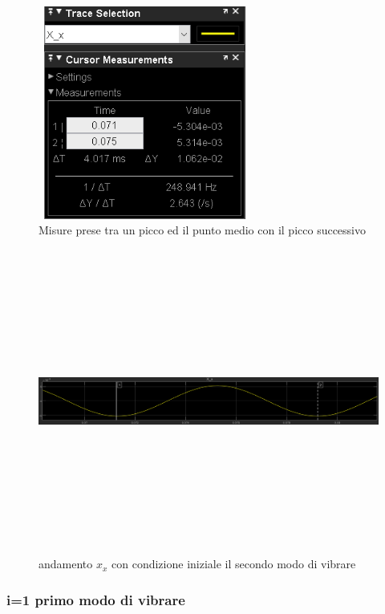 \documentclass{article}
\begin{document}
\begin{enumerate}
\begin{figure}[H]
\centering
\includegraphics[width=7cm,height=7cm,keepaspectratio]{./simulink/assex/modo2_xtab.png}
\caption{Misure prese tra un picco ed il punto medio con il picco successivo}
\end{figure}

\begin{figure}[H]
\centering
\includegraphics[width=12cm,height=10cm,keepaspectratio]{./simulink/assex/modo2_x.png}
\caption{andamento $x_{x}$ con condizione iniziale il secondo modo di vibrare}
\end{figure}
\end{enumerate}

\subsubsection{i=1 primo modo di vibrare}
\end{document}
